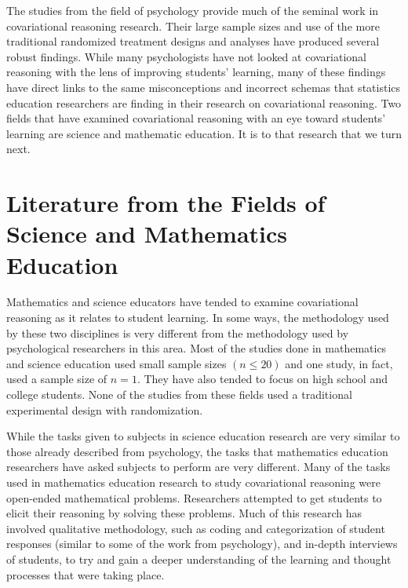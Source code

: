 \documentclass[11pt]{umnthesis}
\begin{document}
The studies from the field of psychology provide much of the seminal work in covariational reasoning research. Their large sample sizes and use of the more traditional randomized treatment designs and analyses have produced several robust findings. While many psychologists have not looked at covariational reasoning with the lens of improving students' learning, many of these findings have direct links to the same misconceptions and incorrect schemas that statistics education researchers are finding in their research on covariational reasoning. Two fields that have examined covariational reasoning with an eye toward students' learning are science and mathematic education. It is to that research that we turn next.

\hypertarget{literature-from-the-fields-of-science-and-mathematics-education}{%
\section{Literature from the Fields of Science and Mathematics Education}\label{literature-from-the-fields-of-science-and-mathematics-education}}

Mathematics and science educators have tended to examine covariational reasoning as it relates to student learning. In some ways, the methodology used by these two disciplines is very different from the methodology used by psychological researchers in this area. Most of the studies done in mathematics and science education used small sample sizes \((n \leq 20)\) and one study, in fact, used a sample size of \(n = 1\). They have also tended to focus on high school and college students. None of the studies from these fields used a traditional experimental design with randomization.

While the tasks given to subjects in science education research are very similar to those already described from psychology, the tasks that mathematics education researchers have asked subjects to perform are very different. Many of the tasks used in mathematics education research to study covariational reasoning were open-ended mathematical problems. Researchers attempted to get students to elicit their reasoning by solving these problems. Much of this research has involved qualitative methodology, such as coding and categorization of student responses (similar to some of the work from psychology), and in-depth interviews of students, to try and gain a deeper understanding of the learning and thought processes that were taking place.
\end{document}
